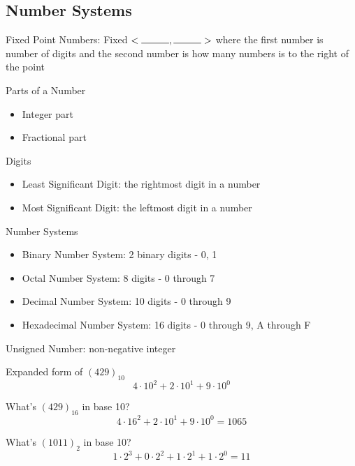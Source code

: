 \documentclass[12pt]{article}
\begin{document}
\subsection{Number Systems}
\begin{definition} Fixed Point Numbers: Fixed $< \rule{1cm}{0.15mm}, \rule{1cm}{0.15mm} > $ where the first number is number of digits and the second number is how many numbers is to the right of the point \end{definition} 
Parts of a Number \begin{itemize} \item Integer part \item Fractional part \end{itemize} 
Digits \begin{itemize} \item Least Significant Digit: the rightmost digit in a number 
\item Most Significant Digit: the leftmost digit in a number \end{itemize} 
Number Systems \begin{itemize} 
\item Binary Number System: 2 binary digits - 0, 1 
\item Octal Number System: 8 digits - 0 through 7
\item Decimal Number System: 10 digits - 0 through 9
\item Hexadecimal Number System: 16 digits - 0 through 9, A through F \end{itemize} 
\begin{definition} Unsigned Number: non-negative integer \end{definition} 
Expanded form of $(429)_10$ $$ 4 \cdot 10^2 + 2 \cdot 10^1 + 9 \cdot 10^0 $$ 
\begin{example} What's $(429)_{16}$ in base 10? $$ 4 \cdot 16^2 + 2 \cdot 10^1 + 9 \cdot 10^0 = 1065$$ 
\end{example} 
\begin{example} What's $(1011)_2$ in base 10? $$ 1 \cdot 2^3 + 0 \cdot 2^2 + 1 \cdot 2^1 + 1 \cdot 2^0 = 11$$ \end{example}
\end{document}
